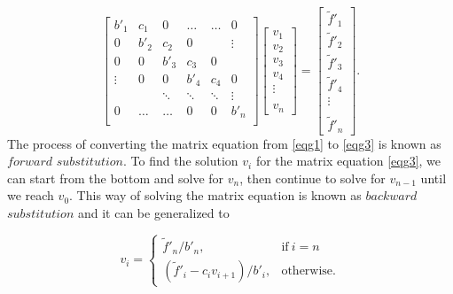 \documentclass[a4paper]{article}
\begin{document}
\begin{equation}
  \begin{bmatrix}
    b'_1 & c_1 & 0  & \hdots & \hdots &   0    \\
    0 & b'_2 & c_2 & 0      & &\vdots \\
    0 & 0 & b'_3  & c_3     & 0 &  \\
    \vdots & 0 & 0  & b'_4     & c_4 & 0 \\
    & & \ddots & \ddots & \ddots & \vdots\\
    0 & \hdots  &\hdots & 0 &0 & b'_n \\
  \end{bmatrix}
  \begin{bmatrix}
    v_1 \\ v_2 \\ v_3 \\ v_4 \\ \vdots \\ \\ v_n
  \end{bmatrix}
  =
  \begin{bmatrix}
    \tilde{f}'_1 \\ \tilde{f}'_2 \\ \tilde{f}'_3 \\ \tilde{f}'_4 \\ \vdots \\ \\ \tilde{f}'_n
  \end{bmatrix}.
  \label{eqg3}
\end{equation}
The process of converting the matrix equation from \eqref{eqg1} to \eqref{eqg3} is known as $forward$ $substitution$. To find the solution $v_i$ for the matrix equation \eqref{eqg3}, we can start from the bottom and solve for $v_n$, then continue to solve for $v_{n-1}$ until we reach $v_0$. This way of solving the matrix equation is known as $backward$ $substitution$ and it can be generalized to

\begin{equation}
    v_i =
    \begin{cases}
      \tilde{f}'_n/b'_n, & \text{if}\ i=n \\
      (\tilde{f}'_i- c_i v_{i+1})/b'_i, & \text{otherwise}.

    \end{cases}
    \label{backward1}
  \end{equation}
\end{document}
